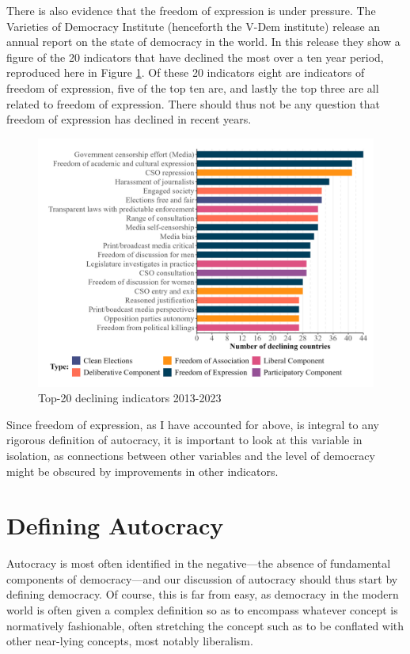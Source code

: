There is also evidence that the freedom of expression is under pressure. The Varieties of Democracy Institute (henceforth the V-Dem institute) release an annual report on the state of democracy in the world. In this release they show a figure of the 20 indicators that have declined the most over a ten year period, reproduced here in Figure \ref{fig:declining}. Of these 20 indicators eight are indicators of freedom of expression, five of the top ten are, and lastly the top three are all related to freedom of expression. There should thus not be any question that freedom of expression has declined in recent years.

\begin{figure}[hbt!]
    \centering
    \includegraphics[width=\linewidth]{graphics/declining_indicators.jpeg}
    \caption{Top-20 declining indicators 2013-2023 \citep[p. 17]{nord_democracy_2025}}
    \label{fig:declining}
\end{figure}

Since freedom of expression, as I have accounted for above, is integral to any rigorous definition of autocracy, it is important to look at this variable in isolation, as connections between other variables and the level of democracy might be obscured by improvements in other indicators.

\section{Defining Autocracy}
Autocracy is most often identified in the negative---the absence of fundamental components of democracy---and our discussion of autocracy should thus start by defining democracy. Of course, this is far from easy, as democracy in the modern world is often given a complex definition so as to encompass whatever concept is normatively fashionable, often stretching the concept such as to be conflated with other near-lying concepts, most notably liberalism.


